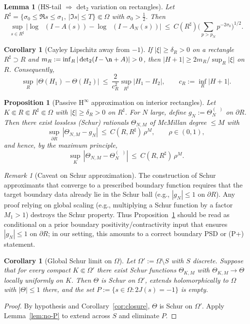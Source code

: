 \documentclass[11pt]{article}
\newtheorem{proposition}[theorem]{Proposition}
\newtheorem{lemma}[theorem]{Lemma}
\newtheorem{corollary}[theorem]{Corollary}
\theoremstyle{remark}
\newtheorem{remark}[theorem]{Remark}
\DeclareMathOperator{\dettwo}{det_2}
\begin{document}
\begin{lemma}[HS-tail \(\Rightarrow\) det$_2$ variation on rectangles]\label{lem:HS-tail-rectangle}
Let \(R^\sharp=\{\sigma_0\le \Re s\le \sigma_1,\ |\Im s|\le T\}\Subset\Omega\) with \(\sigma_0>\tfrac12\). Then
\[
 \sup_{s\in R^\sharp}\big|\log\dettwo(I-A(s))\!-\!\log\dettwo(I-A_N(s))\big|\ \le\ C(R^\sharp)\Big(\sum_{p>p_N}p^{-2\sigma_0}\Big)^{1/2}.
\]
\end{lemma}

\begin{corollary}[Cayley Lipschitz away from \(-1\)]\label{cor:Cayley-rect}
If \(|\xi|\ge \delta_R>0\) on a rectangle \(R^\sharp\supset R\) and \(m_R:=\inf_{R}|\dettwo(I\!-\n+A)|>0\), then \(|H+1|\ge 2m_R/\sup_{R}|\xi|\) on \(R\). Consequently,
\[
 \sup_{R}\,\big|\Theta(H_1)-\Theta(H_2)\big|\ \le\ \frac{2}{c_R^2}\sup_{R^\sharp}|H_1-H_2|,\qquad c_R:=\inf_{R}|H+1|.
\]
\end{corollary}

\begin{proposition}[Passive H$^\infty$ approximation on interior rectangles]\label{prop:hinf-passive}
Let \(K\Subset R\Subset R^\sharp\Subset\Omega\) with \(|\xi|\ge \delta_R>0\) on \(R^\sharp\). For \(N\) large, define \(g_N:=\Theta_N^{(\dettwo)}\) on \(\partial R\). Then there exist lossless (Schur) rationals \(\Theta_{N,M}\) of McMillan degree \(\le M\) with
\[
 \sup_{\partial R}\,|\Theta_{N,M}-g_N|\ \le\ C(R,R^\sharp)\,\rho^{M},\qquad \rho\in(0,1),
\]
and hence, by the maximum principle,
\[
 \sup_{K}\,|\Theta_{N,M}-\Theta_N^{(\dettwo)}|\ \le\ C(R,R^\sharp)\,\rho^{M}.
\]
\end{proposition}

\begin{remark}[Caveat on Schur approximation]
The construction of Schur approximants that converge to a prescribed boundary function requires that the target boundary data already lie in the Schur ball (e.g., \(|g_N|\le 1\) on \(\partial R\)). Any proof relying on global scaling (e.g., multiplying a Schur function by a factor \(M_1>1\)) destroys the Schur property. Thus Proposition~\ref{prop:hinf-passive} should be read as conditional on a prior boundary positivity/contractivity input that ensures \(|g_N|\le 1\) on \(\partial R\); in our setting, this amounts to a correct boundary PSD or (P+) statement.
\end{remark}

\begin{corollary}[Global Schur limit on \(\Omega\)]
Let \(\Omega':=\Omega\setminus S\) with \(S\) discrete. Suppose that for every compact \(K\Subset\Omega'\) there exist Schur functions \(\Theta_{K,M}\) with \(\Theta_{K,M}\to\Theta\) locally uniformly on \(K\). Then \(\Theta\) is Schur on \(\Omega'\), extends holomorphically to \(\Omega\) with \(|\Theta|\le 1\) there, and the set \(P:=\{s\in\Omega: 2J(s)=-1\}\) is empty.
\end{corollary}
\begin{proof}
By hypothesis and Corollary~\ref{cor:closure}, \(\Theta\) is Schur on \(\Omega'\). Apply Lemma~\ref{lem:no-P} to extend across \(S\) and eliminate \(P\). 
\end{proof}
\end{document}
